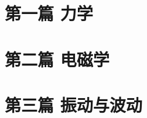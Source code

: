 \documentclass[12pt,a4paper,oneside]{report}
\numberwithin{equation}{section}
\begin{document}

\clearpage
\thispagestyle{fancy}

\tableofcontents
\clearpage

\part{第一篇 力学}






\part{第二篇 电磁学}




\part{第三篇 振动与波动}


\end{document}
